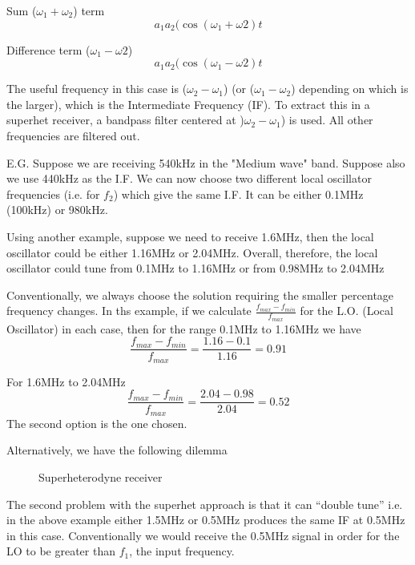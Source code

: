 \documentclass[11pt]{article} %
\begin{document}
Sum ($\omega_1+\omega_2$) term
\begin{equation}
a_1 a_2(\cos{(\omega_1+\omega2 )t}
\end{equation}

Difference term ($\omega_1 - \omega2$)
\begin{equation}
a_1 a_2(\cos{(\omega_1-\omega2 )t}
\end{equation}

The useful frequency in this case is ($\omega_2-\omega_1$) (or ($\omega_1-\omega_2$) depending on which is the larger), which is the Intermediate Frequency (IF). To extract this in a superhet receiver, a bandpass filter centered at )$\omega_2 - \omega_1$) is used. All other frequencies are filtered out.

E.G. Suppose we are receiving 540kHz in the "Medium wave" band. Suppose also we use 440kHz as the I.F. We can now choose two different local oscillator frequencies (i.e. for $f_2$) which give the same I.F. It can be either 0.1MHz (100kHz) or 980kHz.

Using another example, suppose we need to receive 1.6MHz, then the local oscillator could be either 1.16MHz or 2.04MHz. Overall, therefore, the local oscillator could tune from 0.1MHz to 1.16MHz or from 0.98MHz to 2.04MHz

Conventionally, we always choose the solution requiring the smaller percentage frequency changes. In ths example, if we calculate $\frac{f_{max}-f_{min}}{f_{max}}$ for the L.O. (Local Oscillator) in each case, then for the range 0.1MHz to 1.16MHz we have
\begin{equation}
\frac{f_{max}-f_{min}}{f_{max}} = \frac{1.16-0.1}{1.16} = 0.91
\end{equation}

For 1.6MHz to 2.04MHz
\begin{equation}
	\frac{f_{max}-f_{min}}{f_{max}} = \frac{2.04-0.98}{2.04} = 0.52
\end{equation}
The second option is the one chosen.

Alternatively, we have the following dilemma
\begin{figure}[h]
	\centering
	\begin{tikzpicture}
	\end{tikzpicture}
	\label{fig:superhetex}
	\caption{Superheterodyne receiver}
\end{figure}

The second problem with the superhet approach is that it can ``double tune'' i.e. in the above example either 1.5MHz or 0.5MHz produces the same IF at 0.5MHz in this case. Conventionally we would receive the 0.5MHz signal in order for the LO to be greater than $f_1$, the input frequency.
\end{document}
